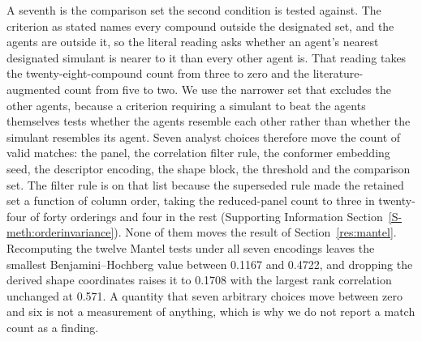 \documentclass[journal=jacsat,manuscript=article,margin=1in]{achemso}
\begin{document}
A seventh is the comparison set the second condition is tested against. The
criterion as stated names every compound outside the designated set, and the
agents are outside it, so the literal reading asks whether an agent's nearest
designated simulant is nearer to it than every other agent is. That reading
takes the twenty-eight-compound count from three to zero and the
literature-augmented count from five to two. We use the narrower set that
excludes the other agents, because a criterion requiring a simulant to beat the
agents themselves tests whether the agents resemble each other rather than
whether the simulant resembles its agent. %
Seven analyst choices therefore move the count of
valid matches: the panel, the correlation filter rule, the conformer embedding
seed, the descriptor encoding, the shape
block, the threshold and the comparison set. The filter rule is on that list because the superseded rule made the retained
set a function of column order, taking the reduced-panel count to three in
twenty-four of forty orderings and four in the rest
(Supporting Information Section~\ref{S-meth:orderinvariance}). None of them moves the result of
Section~\ref{res:mantel}. Recomputing the twelve Mantel tests under all seven
encodings leaves the smallest Benjamini--Hochberg value between 0.1167 and
0.4722, and dropping the derived shape coordinates raises it to 0.1708 with the
largest rank correlation unchanged at 0.571. A quantity that seven arbitrary choices move between zero and
six is not a measurement of anything, which is why we do not report a match
count as a finding.
\end{document}
